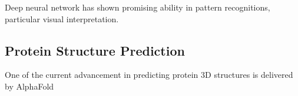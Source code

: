 Deep neural network has shown promising ability in pattern recognitions, particular visual interpretation.
\par 

\subsection{Protein Structure Prediction}
One of the current advancement in predicting protein 3D structures is delivered by AlphaFold